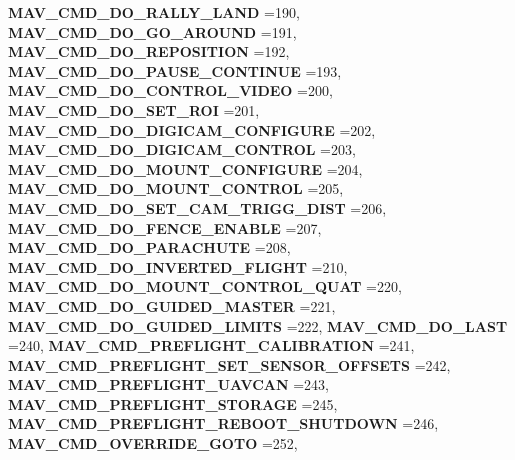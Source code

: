 \begin{DoxyCompactItemize}
\textbf{ M\+A\+V\+\_\+\+C\+M\+D\+\_\+\+D\+O\+\_\+\+R\+A\+L\+L\+Y\+\_\+\+L\+A\+ND} =190, 
\newline
\textbf{ M\+A\+V\+\_\+\+C\+M\+D\+\_\+\+D\+O\+\_\+\+G\+O\+\_\+\+A\+R\+O\+U\+ND} =191, 
\textbf{ M\+A\+V\+\_\+\+C\+M\+D\+\_\+\+D\+O\+\_\+\+R\+E\+P\+O\+S\+I\+T\+I\+ON} =192, 
\textbf{ M\+A\+V\+\_\+\+C\+M\+D\+\_\+\+D\+O\+\_\+\+P\+A\+U\+S\+E\+\_\+\+C\+O\+N\+T\+I\+N\+UE} =193, 
\textbf{ M\+A\+V\+\_\+\+C\+M\+D\+\_\+\+D\+O\+\_\+\+C\+O\+N\+T\+R\+O\+L\+\_\+\+V\+I\+D\+EO} =200, 
\newline
\textbf{ M\+A\+V\+\_\+\+C\+M\+D\+\_\+\+D\+O\+\_\+\+S\+E\+T\+\_\+\+R\+OI} =201, 
\textbf{ M\+A\+V\+\_\+\+C\+M\+D\+\_\+\+D\+O\+\_\+\+D\+I\+G\+I\+C\+A\+M\+\_\+\+C\+O\+N\+F\+I\+G\+U\+RE} =202, 
\textbf{ M\+A\+V\+\_\+\+C\+M\+D\+\_\+\+D\+O\+\_\+\+D\+I\+G\+I\+C\+A\+M\+\_\+\+C\+O\+N\+T\+R\+OL} =203, 
\textbf{ M\+A\+V\+\_\+\+C\+M\+D\+\_\+\+D\+O\+\_\+\+M\+O\+U\+N\+T\+\_\+\+C\+O\+N\+F\+I\+G\+U\+RE} =204, 
\newline
\textbf{ M\+A\+V\+\_\+\+C\+M\+D\+\_\+\+D\+O\+\_\+\+M\+O\+U\+N\+T\+\_\+\+C\+O\+N\+T\+R\+OL} =205, 
\textbf{ M\+A\+V\+\_\+\+C\+M\+D\+\_\+\+D\+O\+\_\+\+S\+E\+T\+\_\+\+C\+A\+M\+\_\+\+T\+R\+I\+G\+G\+\_\+\+D\+I\+ST} =206, 
\textbf{ M\+A\+V\+\_\+\+C\+M\+D\+\_\+\+D\+O\+\_\+\+F\+E\+N\+C\+E\+\_\+\+E\+N\+A\+B\+LE} =207, 
\textbf{ M\+A\+V\+\_\+\+C\+M\+D\+\_\+\+D\+O\+\_\+\+P\+A\+R\+A\+C\+H\+U\+TE} =208, 
\newline
\textbf{ M\+A\+V\+\_\+\+C\+M\+D\+\_\+\+D\+O\+\_\+\+I\+N\+V\+E\+R\+T\+E\+D\+\_\+\+F\+L\+I\+G\+HT} =210, 
\textbf{ M\+A\+V\+\_\+\+C\+M\+D\+\_\+\+D\+O\+\_\+\+M\+O\+U\+N\+T\+\_\+\+C\+O\+N\+T\+R\+O\+L\+\_\+\+Q\+U\+AT} =220, 
\textbf{ M\+A\+V\+\_\+\+C\+M\+D\+\_\+\+D\+O\+\_\+\+G\+U\+I\+D\+E\+D\+\_\+\+M\+A\+S\+T\+ER} =221, 
\textbf{ M\+A\+V\+\_\+\+C\+M\+D\+\_\+\+D\+O\+\_\+\+G\+U\+I\+D\+E\+D\+\_\+\+L\+I\+M\+I\+TS} =222, 
\newline
\textbf{ M\+A\+V\+\_\+\+C\+M\+D\+\_\+\+D\+O\+\_\+\+L\+A\+ST} =240, 
\textbf{ M\+A\+V\+\_\+\+C\+M\+D\+\_\+\+P\+R\+E\+F\+L\+I\+G\+H\+T\+\_\+\+C\+A\+L\+I\+B\+R\+A\+T\+I\+ON} =241, 
\textbf{ M\+A\+V\+\_\+\+C\+M\+D\+\_\+\+P\+R\+E\+F\+L\+I\+G\+H\+T\+\_\+\+S\+E\+T\+\_\+\+S\+E\+N\+S\+O\+R\+\_\+\+O\+F\+F\+S\+E\+TS} =242, 
\textbf{ M\+A\+V\+\_\+\+C\+M\+D\+\_\+\+P\+R\+E\+F\+L\+I\+G\+H\+T\+\_\+\+U\+A\+V\+C\+AN} =243, 
\newline
\textbf{ M\+A\+V\+\_\+\+C\+M\+D\+\_\+\+P\+R\+E\+F\+L\+I\+G\+H\+T\+\_\+\+S\+T\+O\+R\+A\+GE} =245, 
\textbf{ M\+A\+V\+\_\+\+C\+M\+D\+\_\+\+P\+R\+E\+F\+L\+I\+G\+H\+T\+\_\+\+R\+E\+B\+O\+O\+T\+\_\+\+S\+H\+U\+T\+D\+O\+WN} =246, 
\textbf{ M\+A\+V\+\_\+\+C\+M\+D\+\_\+\+O\+V\+E\+R\+R\+I\+D\+E\+\_\+\+G\+O\+TO} =252, 

\end{DoxyCompactItemize}
